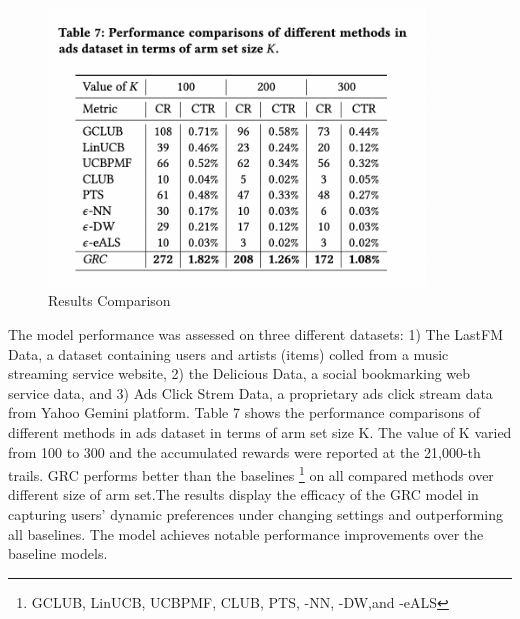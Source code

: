 \begin{figure}[hh!]
    \centering
    \includegraphics[width=100mm]{results_GRC.png}
    \caption{Results Comparison
    \label{overflow}}
\end{figure}
The model performance was assessed on three different datasets: 1) The LastFM Data, a dataset containing  users and artists (items) colled from a music streaming service website, 2) the Delicious Data, a social bookmarking web service data, and 3) Ads Click Strem Data, a proprietary ads click stream data from Yahoo Gemini platform. Table 7 shows the performance comparisons of different methods in ads dataset in terms of arm set size K. The value of K  varied from 100 to 300 and the accumulated rewards were reported  at the 21,000-th trails. GRC performs better than the baselines \footnote {GCLUB, LinUCB, UCBPMF, CLUB, PTS, \textepsilon-NN, \textepsilon-DW,and \textepsilon-eALS} on all compared methods over different size of arm set.The results display the efficacy of the GRC model in capturing users’ dynamic preferences under changing settings and outperforming all baselines. The model achieves notable performance improvements over the baseline models.

